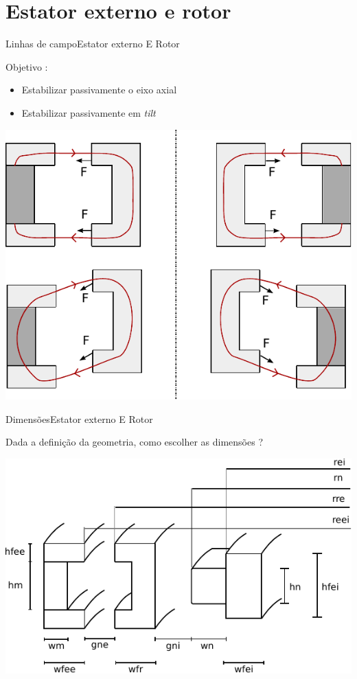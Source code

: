 \documentclass{beamer}
\begin{document}
\section{Estator externo e rotor}

\begin{frame}{Linhas de campo}{Estator externo E Rotor}

Objetivo :
\begin{itemize}
	\item Estabilizar passivamente o eixo axial
	\item Estabilizar passivamente em \textit{tilt}
\end{itemize}
\pause
	\begin{center}
		\includegraphics[width=0.7\linewidth]{../../Dissertacao/Figs/modelo_circuito_passivo_forcas_c}
	\end{center}
\end{frame}	

\begin{frame}{Dimensões}{Estator externo E Rotor}

	Dada	 a definição da geometria, como escolher as dimensões ?
	
	\vspace{1cm}
\centering
  \includegraphics[width=0.7\linewidth]{modelo_dimensoes}
\end{frame}	
\end{document}
